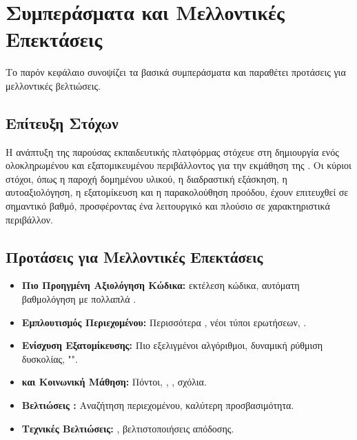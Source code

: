 \section{Συμπεράσματα και Μελλοντικές Επεκτάσεις}
\label{sec:symperasmata_mellontika}
Το παρόν κεφάλαιο συνοψίζει τα βασικά συμπεράσματα και παραθέτει προτάσεις για μελλοντικές βελτιώσεις.

\subsection{Επίτευξη Στόχων}
\label{sec:epiteuxi_stoxon}
Η ανάπτυξη της παρούσας εκπαιδευτικής πλατφόρμας στόχευε στη δημιουργία ενός ολοκληρωμένου και εξατομικευμένου περιβάλλοντος για την εκμάθηση της . Οι κύριοι στόχοι, όπως η παροχή δομημένου υλικού, η διαδραστική εξάσκηση, η αυτοαξιολόγηση, η εξατομίκευση και η παρακολούθηση προόδου, έχουν επιτευχθεί σε σημαντικό βαθμό, προσφέροντας ένα λειτουργικό και πλούσιο σε χαρακτηριστικά περιβάλλον.

\subsection{Προτάσεις για Μελλοντικές Επεκτάσεις}
\label{sec:mellontikes_epektaseis}
\begin{itemize}[leftmargin=*, noitemsep]
    \item \textbf{Πιο Προηγμένη Αξιολόγηση Κώδικα:}  εκτέλεση κώδικα, αυτόματη βαθμολόγηση με πολλαπλά .
    \item \textbf{Εμπλουτισμός Περιεχομένου:} Περισσότερα , νέοι τύποι ερωτήσεων, .
    \item \textbf{Ενίσχυση Εξατομίκευσης:} Πιο εξελιγμένοι αλγόριθμοι, δυναμική ρύθμιση δυσκολίας, "".
    \item \textbf{ και Κοινωνική Μάθηση:} Πόντοι, , , σχόλια.
    \item \textbf{Βελτιώσεις :} Αναζήτηση περιεχομένου, καλύτερη προσβασιμότητα.
    \item \textbf{Τεχνικές Βελτιώσεις:} , βελτιστοποιήσεις απόδοσης.
\end{itemize}